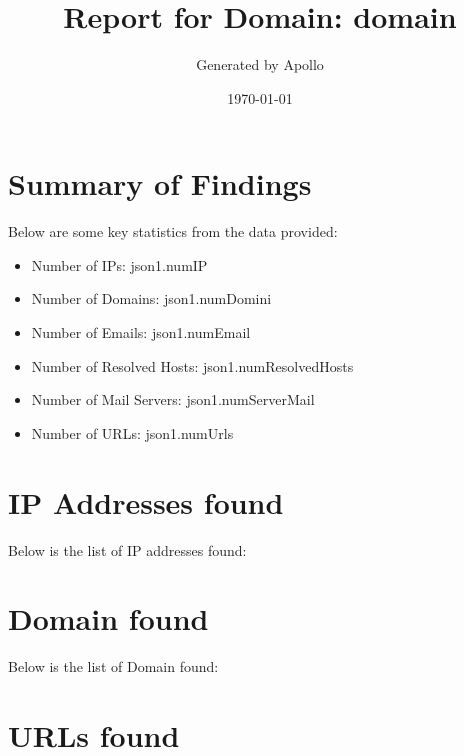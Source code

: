 \documentclass{article}
\title{Report for Domain: {{ domain }}}
\author{Generated by Apollo}
\date{\today}
\begin{document}
\maketitle

\section*{Summary of Findings}

Below are some key statistics from the data provided:

\begin{itemize}
    \item Number of IPs: {{ json1.numIP }}
    \item Number of Domains: {{ json1.numDomini }}
    \item Number of Emails: {{ json1.numEmail }}
    \item Number of Resolved Hosts: {{ json1.numResolvedHosts }}
    \item Number of Mail Servers: {{ json1.numServerMail }}
    \item Number of URLs: {{ json1.numUrls }}
\end{itemize}

\section*{IP Addresses found}

Below is the list of IP addresses found:




\section*{Domain found}

Below is the list of Domain found:




\section*{URLs found}
\end{document}

